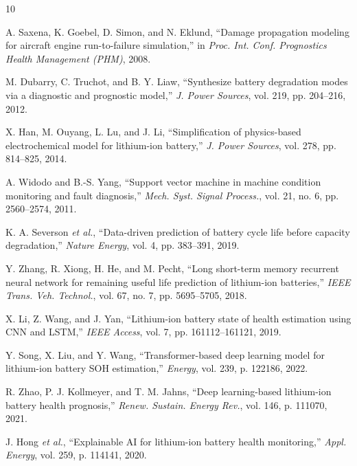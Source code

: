 \documentclass[conference]{IEEEtran}
\begin{document}
\begin{thebibliography}{10}

A. Saxena, K. Goebel, D. Simon, and N. Eklund, ``Damage propagation modeling for aircraft engine run-to-failure simulation,'' in \textit{Proc. Int. Conf. Prognostics Health Management (PHM)}, 2008.

M. Dubarry, C. Truchot, and B. Y. Liaw, ``Synthesize battery degradation modes via a diagnostic and prognostic model,'' \textit{J. Power Sources}, vol. 219, pp. 204--216, 2012.

X. Han, M. Ouyang, L. Lu, and J. Li, ``Simplification of physics-based electrochemical model for lithium-ion battery,'' \textit{J. Power Sources}, vol. 278, pp. 814--825, 2014.

A. Widodo and B.-S. Yang, ``Support vector machine in machine condition monitoring and fault diagnosis,'' \textit{Mech. Syst. Signal Process.}, vol. 21, no. 6, pp. 2560--2574, 2011.

K. A. Severson \textit{et al.}, ``Data-driven prediction of battery cycle life before capacity degradation,'' \textit{Nature Energy}, vol. 4, pp. 383--391, 2019.

Y. Zhang, R. Xiong, H. He, and M. Pecht, ``Long short-term memory recurrent neural network for remaining useful life prediction of lithium-ion batteries,'' \textit{IEEE Trans. Veh. Technol.}, vol. 67, no. 7, pp. 5695--5705, 2018.

X. Li, Z. Wang, and J. Yan, ``Lithium-ion battery state of health estimation using CNN and LSTM,'' \textit{IEEE Access}, vol. 7, pp. 161112--161121, 2019.

Y. Song, X. Liu, and Y. Wang, ``Transformer-based deep learning model for lithium-ion battery SOH estimation,'' \textit{Energy}, vol. 239, p. 122186, 2022.

R. Zhao, P. J. Kollmeyer, and T. M. Jahns, ``Deep learning-based lithium-ion battery health prognosis,'' \textit{Renew. Sustain. Energy Rev.}, vol. 146, p. 111070, 2021.

J. Hong \textit{et al.}, ``Explainable AI for lithium-ion battery health monitoring,'' \textit{Appl. Energy}, vol. 259, p. 114141, 2020.

\end{thebibliography}
\end{document}
